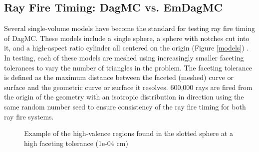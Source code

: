 \documentclass{anstrans}
\begin{document}


\subsection{Ray Fire Timing: DagMC vs. EmDagMC}

Several single-volume models have become the standard for testing ray fire timing of DagMC. These models include a single sphere, a sphere with notches cut into it, and a high-aspect ratio cylinder all centered on the origin (Figure \ref{models}) . In testing, each of these models are meshed using increasingly smaller faceting tolerances to vary the number of triangles in the problem. The faceting tolerance is defined as the maximum distance between the faceted (meshed) curve or surface and the geometric curve or surface it resolves. 600,000 rays are fired from the origin of the geometry with an isotropic distribution in direction using the same random number seed to ensure consistency of the ray fire timing for both ray fire systems.

\begin{figure}

  \begin{center}

    \caption{Example of the high-valence regions found in the slotted sphere at a high faceting tolerance (1e-04 cm) \label{hv}}

  \end{center}

\end{figure}
\end{document}
